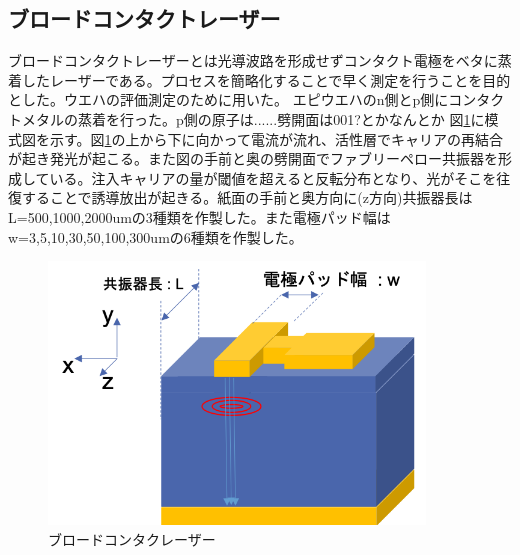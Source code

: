 \subsection{ブロードコンタクトレーザー}%
ブロードコンタクトレーザーとは光導波路を形成せずコンタクト電極をベタに蒸着したレーザーである。プロセスを簡略化することで早く測定を行うことを目的とした。ウエハの評価測定のために用いた。
エピウエハのn側とp側にコンタクトメタルの蒸着を行った。p側の原子は......劈開面は001?とかなんとか
図\ref{fig:sample_broadcontact}に模式図を示す。図\ref{fig:sample_broadcontact}の上から下に向かって電流が流れ、活性層でキャリアの再結合が起き発光が起こる。また図の手前と奥の劈開面でファブリーペロー共振器を形成している。注入キャリアの量が閾値を超えると反転分布となり、光がそこを往復することで誘導放出が起きる。紙面の手前と奥方向に(z方向)共振器長はL=500,1000,2000umの3種類を作製した。また電極パッド幅はw=3,5,10,30,50,100,300umの6種類を作製した。

\begin{figure}[t]
	\centering
	\includegraphics[width=10cm]{figure/fig_2_1_broadcontact.png}
	\caption{ブロードコンタクレーザー}
	\label{fig:sample_broadcontact}
\end{figure}


